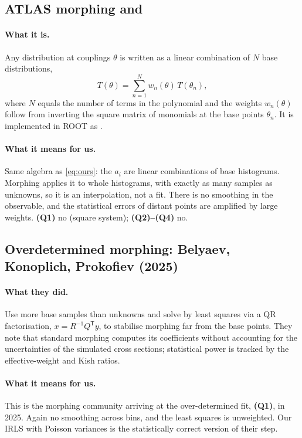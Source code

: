 \subsection{ATLAS morphing \cite{ATLmorph} and  \cite{RooMorph}}

\paragraph{What it is.} Any distribution at couplings $\theta$ is written as a linear
combination of $N$ base distributions,
\begin{equation}
T(\theta) = \sum_{n=1}^{N} w_n(\theta)\,T(\theta_n),
\end{equation}
where $N$ equals the number of terms in the polynomial and the weights $w_n(\theta)$ follow
from inverting the square matrix of monomials at the base points $\theta_n$. It is
implemented in ROOT as .

\paragraph{What it means for us.} Same algebra as \cref{eq:ours}: the $a_i$ are linear
combinations of base histograms. Morphing applies it to whole histograms, with exactly as many
samples as unknowns, so it is an interpolation, not a fit. There is no smoothing in the
observable, and the statistical errors of distant points are amplified by large weights.
\textbf{(Q1)} no (square system); \textbf{(Q2)--(Q4)} no.

\subsection{Overdetermined morphing: Belyaev, Konoplich, Prokofiev (2025) \cite{Belyaev2025}}

\paragraph{What they did.} Use more base samples than unknowns and solve by least squares via
a QR factorisation, $x = R^{-1}Q^{\mathsf T}y$, to stabilise morphing far from the base
points. They note that standard morphing computes its coefficients without accounting for
the uncertainties of the simulated cross sections; statistical power is tracked by the
effective-weight and Kish ratios.

\paragraph{What it means for us.} This is the morphing community arriving at the
over-determined fit, \textbf{(Q1)}, in 2025. Again no smoothing across bins, and the least
squares is unweighted. Our IRLS with Poisson variances is the statistically correct version
of their step.


